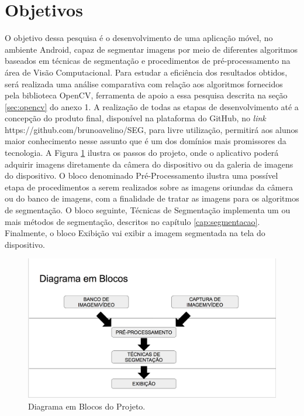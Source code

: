\section{Objetivos}\label{sec:objetivos}
O objetivo dessa pesquisa é o desenvolvimento de uma aplicação móvel, no ambiente Android, capaz de segmentar imagens por meio de diferentes algoritmos baseados em técnicas de segmentação e procedimentos de pré-processamento na área de Visão Computacional. Para estudar a eficiência dos resultados obtidos, será realizada uma análise comparativa com relação aos algoritmos fornecidos pela biblioteca OpenCV, ferramenta de apoio a essa pesquisa descrita na seção \ref{sec:opencv} do anexo 1. A realização de todas as etapas de desenvolvimento até a concepção do produto final, disponível na plataforma do GitHub, no \textit{link} https://github.com/brunoavelino/SEG, para livre utilização, permitirá aos alunos maior conhecimento nesse assunto que é um dos domínios mais promissores da tecnologia. A Figura \ref{fig:diag_blocos} ilustra os passos do projeto, onde o aplicativo poderá adquirir imagens diretamente da câmera do dispositivo ou da galeria de imagens do dispositivo. O bloco denominado Pré-Processamento ilustra uma possível etapa de procedimentos a serem realizados sobre as imagens oriundas da câmera ou do banco de imagens, com a finalidade de tratar as imagens para os algoritmos de segmentação. O bloco seguinte, Técnicas de Segmentação implementa um ou mais métodos de segmentação, descritos no capítulo \ref{cap:segmentacao}. Finalmente, o bloco Exibição vai exibir a imagem segmentada na tela do dispositivo. 

  \begin{figure}[!htb]
       \begin{center}  
          \includegraphics[width=0.7\columnwidth]{img/diag_blocos.png}
           \caption{\label{fig:diag_blocos}Diagrama em Blocos do Projeto.}
       \end{center}
   \end{figure}


